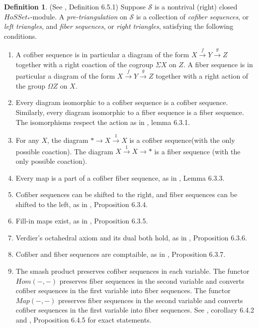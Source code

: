 \documentclass{article}
\theoremstyle{definition}
\newtheorem{definition}[theorem]{Definition}
\theoremstyle{remark}
\begin{document}
\begin{definition}
    (See \cite{MR1650134}, Definition 6.5.1) \label{def:preTristruct}Suppose $\mathcal{S}$ is a nontrival (right) closed $Ho SSet_{*}$-module. A \textit{pre-triangulation} on $\mathcal{S}$ is a collection of \textit{cofiber sequences}, or \textit{left triangles}, and \textit{fiber sequences}, or \textit{right triangles}, satisfying the following conditions.
    \begin{enumerate}
         
    
        \item A cofiber sequence is in particular a diagram of the form $X \xrightarrow{f} Y \xrightarrow{g} Z$ together with a right coaction of the cogroup $\Sigma X$ on $Z$. A fiber sequence is in particular a diagram of the form $X \xrightarrow{f} Y \xrightarrow{g} Z$ together with a right action of the group $\Omega Z$ on $X$.
        \item Every diagram isomorphic to a cofiber sequence is a cofiber sequence. Similarly, every diagram isomorphic to a fiber sequence is a fiber sequence. The isomorphisms respect the action as in \cite{MR1650134}, lemma 6.3.1.
        \item For any $X$, the diagram $* \rightarrow X \xrightarrow{1} X$ is a cofiber sequence(with the only possible coaction). The diagram $X \xrightarrow{1} X \rightarrow *$ is a fiber sequence (with the only possible coaction).
        \item Every map is a part of a cofiber fiber sequence, as in \cite{MR1650134}, Lemma 6.3.3.
        \item Cofiber sequences can be shifted to the right, and fiber sequences can be shifted to the left, as in \cite{MR1650134}, Proposition 6.3.4.
        \item Fill-in maps exist, as in \cite{MR1650134}, Proposition 6.3.5.
        \item Verdier's octahedral axiom and its dual both hold, as in \cite{MR1650134}, Proposition 6.3.6.
        \item Cofiber and fiber sequences are comptaible, as in \cite{MR1650134}, Proposition 6.3.7.
        \item The smash product preserves cofiber sequences in each variable. The functor $Hom(-,-)$ preserves fiber sequences in the second variable and converts cofiber sequences in the first variable into fiber sequences. The functor $Map(-,-)$ preserves fiber sequences in the second variable and converts cofiber sequences in the first variable into fiber sequences. See \cite{MR1650134}, corollary 6.4.2 and \cite{MR1650134}, Proposition 6.4.5 for exact statements.
    \end{enumerate}
\end{definition}
\end{document}

